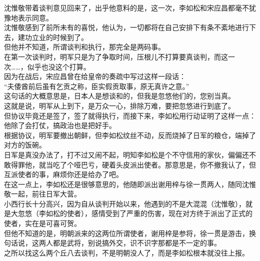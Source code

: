 \begin{multicols}{\theparacolNo}
沈惟敬带着谈判意见回来了，出乎他意料的是，这一次，李如松和宋应昌都毫不犹豫地表示同意。\\

沈惟敬感到了前所未有的喜悦，他认为，一切都将在自己安排下有条不紊地进行下去，建功立业的时候到了。\\

但他并不知道，所谓谈判和执行，那完全是两码事。\\

在第一次谈判时，明军只是为了争取时间，压根儿不打算要真谈判，而这一次……，似乎也没这个打算。\\

因为在战后，宋应昌曾在给皇帝的奏疏中写过这样一段话：\\

“夫倭酋前后虽有乞贡之称，臣实假贡取事，原无真许之意。”\\

这句话的大概意思是，日本人是想谈和的，但我是忽悠他们的，您别当真。\\

这就是说，明军从上到下，是万众一心，排除万难，要把忽悠进行到底了。\\

但协议毕竟还是签了，签了就得执行，而接下来，李如松用行动证明了这样一点：他除了会打仗，搞政治也是把好手。\\

根据协议，明军要撤出朝鲜，但李如松纹丝不动，反而烧掉了日军的粮仓，端掉了对方的饭碗。\\

日军是真没办法了，打不过又闹不起，明知李如松是个不守信用的家伙，偏偏还不敢得罪他，就当吃了个哑巴亏，硬着头皮派出使者。那意思是，你不撤我认了，但互派使者的事，麻烦你还是给办了吧。\\

在这一点上，李如松还是很够意思的，他随即派出谢用梓与徐一贯两人，随同沈惟敬一起，前往日军大营。\\

小西行长十分高兴，因为自从谈判开始以来，他遇到的不是大混混（沈惟敬），就是大忽悠（李如松的使者），感情受到了严重的伤害，现在对方终于派出了正式的使者，实在是可喜可贺。\\

但他不知道的是，明朝派来的这两位所谓使者，谢用梓是参将，徐一贯是游击，换句话说，这两人都是武将，别说搞外交，识不识字那都是不一定的事。\\

之所以找这么两个丘八去谈判，不是明朝没人了，而是李如松根本就没往上报。\\


\end{multicols}
